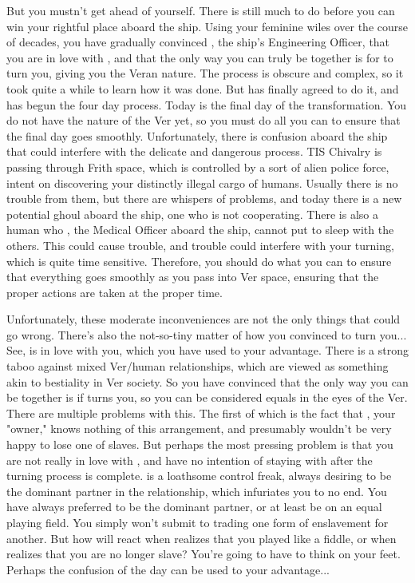 \documentclass[char]{guildcamp4}
\begin{document}
But you mustn't get ahead of yourself. There is still much to do before you can win your rightful place aboard the ship. Using your feminine wiles over the course of decades, you have gradually convinced \cVtwo{}, the ship's Engineering Officer, that you are in love with \cVtwo{\them}, and that the only way you can truly be together is for \cVtwo{} to turn you, giving you the Veran nature. The process is obscure and complex, so it took \cVtwo{} quite a while to learn how it was done. But \cVtwo{} has finally agreed to do it, and has begun the four day process. Today is the final day of the transformation. You do not have the nature of the Ver yet, so you must do all you can to ensure that the final day goes smoothly. Unfortunately, there is confusion aboard the ship that could interfere with the delicate and dangerous process. TIS Chivalry is passing through Frith space, which is controlled by a sort of alien police force, intent on discovering your distinctly illegal cargo of humans. Usually there is no trouble from them, but there are whispers of problems, and today there is a new potential ghoul aboard the ship, one who is not cooperating. There is also a human who \cVthree{}, the Medical Officer aboard the ship, cannot put to sleep with the others. This could cause trouble, and trouble could interfere with your turning, which is quite time sensitive. Therefore, you should do what you can to ensure that everything goes smoothly as you pass into Ver space, ensuring that the proper actions are taken at the proper time.

Unfortunately, these moderate inconveniences are not the only things that could go wrong. There's also the not-so-tiny matter of how you convinced \cVtwo{} to turn you... See, \cVtwo{} is in love with you, which you have used to your advantage. There is a strong taboo against mixed Ver/human relationships, which are viewed as something akin to bestiality in Ver society. So you have convinced \cVtwo{\them} that the only way you can be together is if \cVtwo{\they} turns you, so you can be considered equals in the eyes of the Ver. There are multiple problems with this. The first of which is the fact that \cVone{}, your "owner," knows nothing of this arrangement, and presumably wouldn't be very happy to lose one of \cVone{\their} slaves. But perhaps the most pressing problem is that you are not really in love with \cVtwo{}, and have no intention of staying with \cVtwo{\them} after the turning process is complete. \cVtwo{} is a loathsome control freak, always desiring to be the dominant partner in the relationship, which infuriates you to no end. You have always preferred to be the dominant partner, or at least be on an equal playing field. You simply won't submit to trading one form of enslavement for another. But how will \cVtwo{} react when \cVtwo{\they} realizes that you played \cVtwo{\them} like a fiddle, or \cVone{} when \cVone{\they} realizes that you are no longer \cVone{\their} slave? You're going to have to think on your feet. Perhaps the confusion of the day can be used to your advantage...
\end{document}
